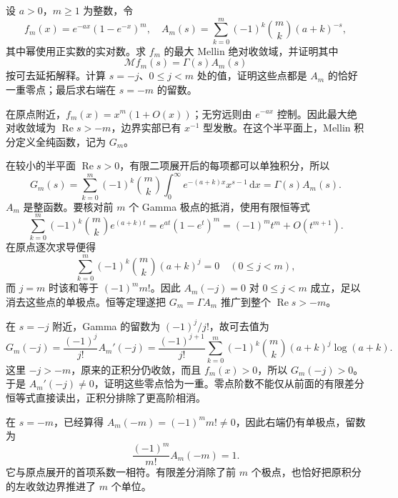 \begin{exercise}[高阶抵消与可去值]\label{b3:ex:21-6}
设 \(a>0\)，\(m\ge1\) 为整数，令
\[
 f_m(x)=e^{-ax}(1-e^{-x})^m,\quad
 A_m(s)=\sum_{k=0}^m(-1)^k\binom mk(a+k)^{-s},
\]
其中幂使用正实数的实对数。求 \(f_m\) 的最大 Mellin 绝对收敛域，并证明其中
\[
 \mathcal Mf_m(s)=\Gamma(s)A_m(s)
\]
按可去延拓解释。计算 \(s=-j\)、\(0\le j<m\) 处的值，证明这些点都是 \(A_m\) 的恰好一重零点；最后求右端在 \(s=-m\) 的留数。
\end{exercise}
\begin{solution}
在原点附近，\(f_m(x)=x^m(1+O(x))\)；无穷远则由 \(e^{-ax}\) 控制。因此最大绝对收敛域为 \(\operatorname{Re}s>-m\)，边界实部已有 \(x^{-1}\) 型发散。在这个半平面上，Mellin 积分定义全纯函数，记为 \(G_m\)。

在较小的半平面 \(\operatorname{Re}s>0\)，有限二项展开后的每项都可以单独积分，所以
\[
 G_m(s)=\sum_{k=0}^m(-1)^k\binom mk
 \int_0^\infty e^{-(a+k)x}x^{s-1}\,\mathrm{d}x
 =\Gamma(s)A_m(s).
\]
\(A_m\) 是整函数。要核对前 \(m\) 个 Gamma 极点的抵消，使用有限恒等式
\[
 \sum_{k=0}^m(-1)^k\binom mk e^{(a+k)t}
 =e^{at}(1-e^t)^m=(-1)^mt^m+O(t^{m+1}).
\]
在原点逐次求导便得
\[
 \sum_{k=0}^m(-1)^k\binom mk(a+k)^j=0\quad(0\le j<m),
\]
而 \(j=m\) 时该和等于 \((-1)^m m!\)。因此
\(A_m(-j)=0\) 对 \(0\le j<m\) 成立，足以消去这些点的单极点。恒等定理遂把 \(G_m=\Gamma A_m\) 推广到整个 \(\operatorname{Re}s>-m\)。

在 \(s=-j\) 附近，Gamma 的留数为 \((-1)^j/j!\)，故可去值为
\[
 G_m(-j)=\frac{(-1)^j}{j!}A_m'(-j)
 =\frac{(-1)^{j+1}}{j!}
 \sum_{k=0}^m(-1)^k\binom mk(a+k)^j\log(a+k).
\]
这里 \(-j>-m\)，原来的正积分仍收敛，而且 \(f_m(x)>0\)，所以 \(G_m(-j)>0\)。于是 \(A_m'(-j)\ne0\)，证明这些零点恰为一重。零点阶数不能仅从前面的有限差分恒等式直接读出，正积分排除了更高阶相消。

在 \(s=-m\)，已经算得 \(A_m(-m)=(-1)^m m!\ne0\)，因此右端仍有单极点，留数为
\[
 \frac{(-1)^m}{m!}A_m(-m)=1.
\]
它与原点展开的首项系数一相符。有限差分消除了前 \(m\) 个极点，也恰好把原积分的左收敛边界推进了 \(m\) 个单位。
\end{solution}

